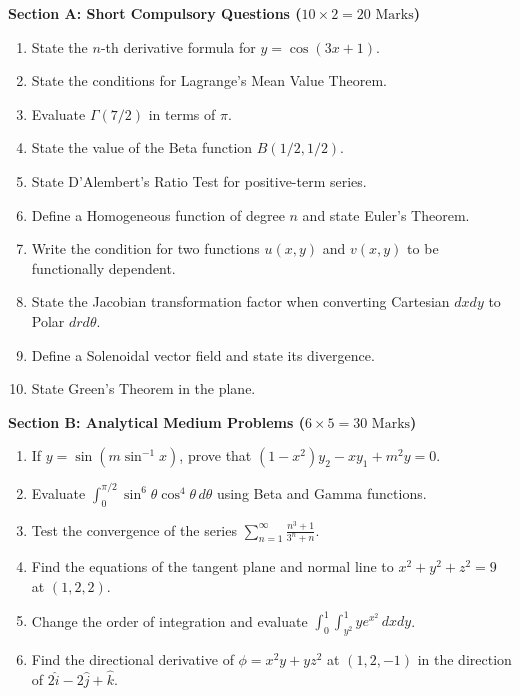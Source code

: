 \begin{mockexam}
\noindent\textbf{Section A: Short Compulsory Questions ($10 \times 2 = 20\text{ Marks}$)}
\begin{enumerate}[leftmargin=1.5em]
    \item State the $n$-th derivative formula for $y = \cos(3x+1)$.
    \item State the conditions for Lagrange's Mean Value Theorem.
    \item Evaluate $\Gamma(7/2)$ in terms of $\pi$.
    \item State the value of the Beta function $B(1/2, 1/2)$.
    \item State D'Alembert's Ratio Test for positive-term series.
    \item Define a Homogeneous function of degree $n$ and state Euler's Theorem.
    \item Write the condition for two functions $u(x,y)$ and $v(x,y)$ to be functionally dependent.
    \item State the Jacobian transformation factor when converting Cartesian $dx dy$ to Polar $dr d\theta$.
    \item Define a Solenoidal vector field and state its divergence.
    \item State Green's Theorem in the plane.
\end{enumerate}

\medskip
\noindent\textbf{Section B: Analytical Medium Problems ($6 \times 5 = 30\text{ Marks}$)}
\begin{enumerate}[leftmargin=1.5em, start=11]
    \item If $y = \sin(m\sin^{-1}x)$, prove that $(1-x^2)y_2 - x y_1 + m^2 y = 0$.
    \item Evaluate $\int_0^{\pi/2} \sin^6\theta \cos^4\theta\,d\theta$ using Beta and Gamma functions.
    \item Test the convergence of the series $\sum_{n=1}^\infty \frac{n^3 + 1}{3^n + n}$.
    \item Find the equations of the tangent plane and normal line to $x^2 + y^2 + z^2 = 9$ at $(1, 2, 2)$.
    \item Change the order of integration and evaluate $\int_0^1 \int_{y^2}^1 y e^{x^2}\,dx dy$.
    \item Find the directional derivative of $\phi = x^2 y + y z^2$ at $(1, 2, -1)$ in the direction of $2\hat{i} - 2\hat{j} + \hat{k}$.
\end{enumerate}


\end{mockexam}
